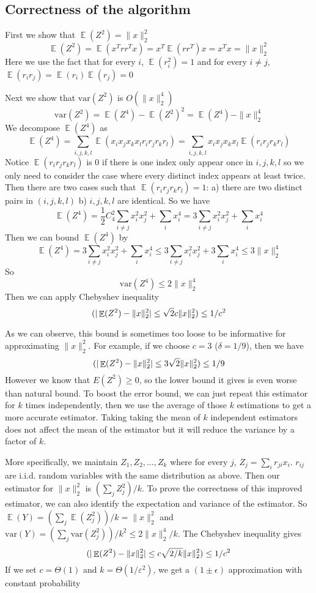 \documentclass[11pt]{article}
\DeclareMathOperator*{\E}{\mathbb{E}}
\let\Pr\relax
\DeclareMathOperator*{\Pr}{\mathbb{P}}
\newcommand{\eps}{\varepsilon}
\newcommand{\var}{\mathrm{var}}
\begin{document}
\subsection{Correctness of the algorithm}
First we show that $\E(Z^2) = \|x\|^2_2$
$$ \E(Z^2) = \E(x^Trr^Tx) = x^T\E(rr^T)x = x^Tx = \|x\|^2_2$$
Here we use the fact that for every $i$, $\E(r_i^2) = 1$ and for every $i \neq j$, $\E(r_ir_j) = \E(r_i)\E(r_j) = 0$

Next we show that $\var(Z^2)$ is $O(\|x\|_2^4)$
$$ \var(Z^2) = \E(Z^4) - \E(Z^2)^2 = \E(Z^4) - \|x\|_2^4$$
We decompose $\E(Z^4)$ as
$$\E(Z^4) = \sum_{i,j,k,l}\E(x_ix_jx_kx_lr_ir_jr_kr_l) = \sum_{i,j,k,l}x_ix_jx_kx_l\E(r_ir_jr_kr_l) $$
Notice $\E(r_ir_jr_kr_l)$ is 0 if there is one index only appear once in $i,j,k,l$ so we only need to consider the case where every distinct index appears at least twice. Then there are two cases such that $\E(r_ir_jr_kr_l) = 1$: a) there are two distinct pairs in $(i, j, k, l)$ b) $i, j, k, l$ are identical. So we have
$$\E(Z^4) = \frac{1}{2}C_4^2\sum_{i \neq j}x_i^2x_j^2 + \sum_i x_i^4 = 3\sum_{i \neq j}x_i^2x_j^2 + \sum_i x_i^4$$
Then we can bound $\E(Z^4)$ by
$$\E(Z^4) = 3\sum_{i \neq j}x_i^2x_j^2 + \sum_i x_i^4 \leq 3\sum_{i \neq j}x_i^2x_j^2 + 3\sum_i x_i^4 \leq 3\|x\|_2^4$$
So
$$\var(Z^4) \leq 2\|x\|_2^4 $$
Then we can apply Chebyshev inequality
$$ \Pr(|\E(Z^2) - \|x\|_2^2| \leq \sqrt{2}c\|x\|_2^2) \leq 1/c^2 $$

As we can observe, this bound is sometimes too loose to be informative for approximating $\|x\|_2^2$. For example, if we choose $c = 3$ ($\delta = 1/9$), then we have 
$$ \Pr(|\E(Z^2) - \|x\|_2^2| \leq 3\sqrt{2}\|x\|_2^2) \leq 1/9 $$
However we know that $E(Z^2) \geq 0$, so the lower bound it gives is even worse than natural bound. To boost the error bound, we can just repeat this estimator for $k$ times independently, then we use the average of those $k$ estimations to get a more accurate estimator. Taking taking the mean of $k$ independent estimators does not affect the mean of the estimator but it will reduce the variance by a factor of $k$. 

More specifically, we maintain $Z_1, Z_2, \ldots, Z_k$ where for every $j$, $Z_j = \sum_i r_{ji}x_i$. $r_{ij}$ are i.i.d. random variables with the same distribution as above. Then our estimator for $\|x\|_2^2$ is $(\sum_j Z_j^2)/k$. To prove the correctness of this improved estimator, we can also identify the expectation and variance of the estimator. So $\E(Y) = (\sum_j \E(Z_j^2))/k = \|x\|_2^2$ and $\var(Y) = (\sum_j \var(Z_j^2))/k^2 \leq 2\|x\|_2^4/k$. The Chebyshev inequality gives
$$ \Pr(|\E(Z^2) - \|x\|_2^2| \leq c\sqrt{2/k}\|x\|_2^2) \leq 1/c^2 $$
If we set $c = \Theta(1)$ and $k = \Theta(1/\eps^2)$, we get a $(1 \pm \epsilon)$ approximation with constant probability
\end{document}
